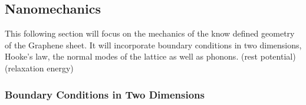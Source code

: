 
\subsection{Nanomechanics}
This following section will focus on the mechanics of the know defined geometry of the Graphene sheet. It will incorporate boundary conditions in two dimensions, Hooke's law, the normal modes of the lattice as well as phonons. (rest potential) (relaxation energy)

\subsubsection{Boundary Conditions in Two Dimensions}
